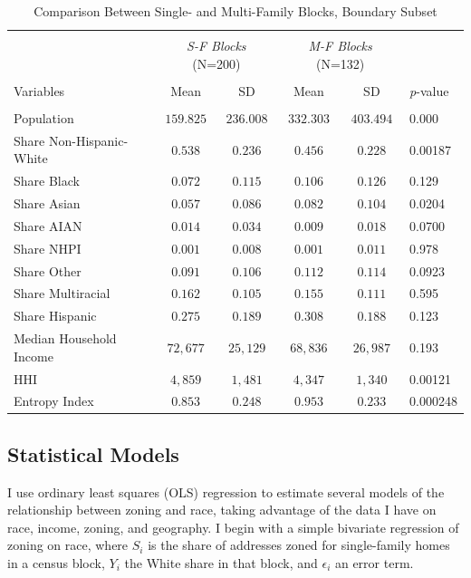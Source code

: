 \documentclass[11pt]{article}
\begin{document}
\begin{table}[!htbp] \centering 
  \caption{Comparison Between Single- and Multi-Family Blocks, Boundary Subset} 
  \label{tab:balance_table} 
\begin{tabular}{@{\extracolsep{5pt}} lccccl} 
\\[-1.8ex]\hline 
\hline \\[-1.8ex] 


&\multicolumn{2}{c}{\textit{S-F Blocks }(N=200)}&\multicolumn{2}{c}{\textit{M-F Blocks }(N=132)}\\
 \cline{2-3} \cline{4-5}
 \\[-1.8ex] 
 Variables & Mean & SD & Mean & SD & \textit{p}-value\\ 

\hline \\[-1.8ex] 
Population & $159.825$ & $236.008$ & $332.303$ & $403.494$ &0.000\\ 
Share Non-Hispanic-White & $0.538$ & $0.236$ & $0.456$ & $0.228$ & 0.00187\\ 
Share Black & $0.072$ & $0.115$ & $0.106$ & $0.126$ &0.129\\ 
Share Asian & $0.057$ & $0.086$ & $0.082$ & $0.104$ &0.0204\\ 
Share AIAN & $0.014$ & $0.034$ & $0.009$ & $0.018$ & 0.0700\\ 
Share NHPI & $0.001$ & $0.008$ & $0.001$ & $0.011$ & 0.978\\ 
Share Other & $0.091$ & $0.106$ & $0.112$ & $0.114$ & 0.0923\\ 
Share Multiracial & $0.162$ & $0.105$ & $0.155$ & $0.111$ & 0.595\\ 
Share Hispanic & $0.275$ & $0.189$ & $0.308$ & $0.188$ & 0.123\\ 
Median Household Income & $72,677$ & $25,129$ & $68,836$ & $26,987$ & 0.193\\ 
HHI & $4,859$ & $1,481$ & $4,347$ & $1,340$ & 0.00121\\
Entropy Index & $0.853$ & $0.248$ & $0.953$ & $0.233$ & 0.000248\\ 
\hline
\hline
\end{tabular} 
\end{table} 



\subsection{Statistical Models}

I use ordinary least squares (OLS) regression to estimate several models of the relationship between zoning and race, taking advantage of the data I have on race, income, zoning, and geography. I begin with a simple bivariate regression of zoning on race, where $S_i$ is the share of addresses zoned for single-family homes in a census block, $Y_i$ the White share in that block, and $\epsilon_i$ an error term.
\end{document}

